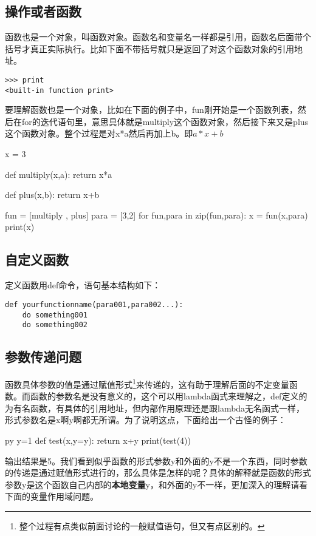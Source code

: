 \documentclass[12pt,oneside]{book}
\begin{document}
\begin{common-format}
\chapter{操作或者函数}
函数也是一个对象，叫函数对象。函数名和变量名一样都是引用，函数名后面带个括号才真正实际执行。比如下面不带括号就只是返回了对这个函数对象的引用地址。
\begin{Verbatim}
>>> print
<built-in function print>
\end{Verbatim}

要理解函数也是一个对象，比如在下面的例子中，fun刚开始是一个函数列表，然后在for的迭代语句里，意思具体就是multiply这个函数对象，然后接下来又是plus这个函数对象。整个过程是对x*a然后再加上b。即$ a*x +b $

\begin{tcbpython}[]
x = 3

def multiply(x,a):
    return x*a

def plus(x,b):
    return x+b

fun = [multiply , plus]
para = [3,2]
for fun,para in zip(fun,para):
    x = fun(x,para)
print(x)
\end{tcbpython}



\section{自定义函数}
定义函数用def命令，语句基本结构如下：
\begin{Verbatim}
def yourfunctionname(para001,para002...):
    do something001
    do something002
\end{Verbatim}



\section{参数传递问题}
函数具体参数的值是通过赋值形式\footnote{整个过程有点类似前面讨论的一般赋值语句，但又有点区别的。}来传递的，这有助于理解后面的不定变量函数。而函数的参数名是没有意义的，这个可以用lambda函式来理解之，def定义的为有名函数，有具体的引用地址，但内部作用原理还是跟lambda无名函式一样，形式参数名是x啊y啊都无所谓。为了说明这点，下面给出一个古怪的例子：

\begin{xverbatim}[129]{py}
y=1
def test(x,y=y):
    return x+y
print(test(4))
\end{xverbatim}

输出结果是5。我们看到似乎函数的形式参数y和外面的y不是一个东西，同时参数的传递是通过赋值形式进行的，那么具体是怎样的呢？具体的解释就是函数的形式参数y是这个函数自己内部的\textbf{本地变量}y，和外面的y不一样，更加深入的理解请看下面的变量作用域问题。


\end{common-format}
\end{document}
